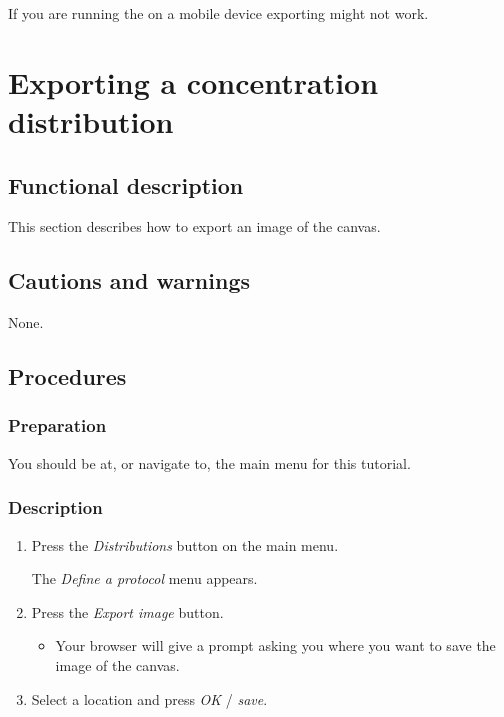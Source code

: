 If you are running the \applicationname on a mobile device exporting might not work.


\section{Exporting a concentration distribution}
\label{sec:exportDist}

\subsection{Functional description}
This section describes how to export an image of the canvas.

\subsection{Cautions and warnings}
None.

\subsection{Procedures}
\subsubsection{Preparation}
You should be at, or navigate to, the main menu for this tutorial.

\subsubsection{Description}
\begin{enumerate}
	\item Press the \emph{Distributions} button on the main menu. 
		\begin{itemize}
            The \emph{Define a protocol} menu appears.
		\end{itemize}
	\item Press the \emph{Export image} button. 
		\begin{itemize}
            \item Your browser will give a prompt asking you where you want to save the image of the canvas. 
		\end{itemize}
	\item  Select a location and press \emph{OK} / \emph{save}.
\end{enumerate}

